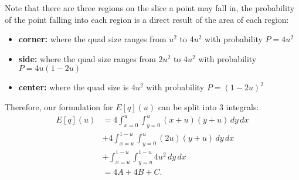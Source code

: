 Note that there are three regions on the slice a point may fall in,
the probability of the point falling into each region is a direct result
of the area of each region:

\begin{itemize}
\item \textbf{corner:} where the quad size ranges from $u^2$ to $4u^2$
                    with probability $P = 4u^2$
\item \textbf{side:}   where the quad size ranges from $2u^2$ to $4u^2$ 
                    with probability $P = 4u(1-2u)$
\item \textbf{center:} where the quad size is $4u^2$
                    with probability $P = (1-2u)^2$
\end{itemize}

Therefore, our formulation for $E[q](u)$ can be split into 3 integrals:
\begin{align*}
  E[q](u) &=   4 \int_{x=0}^u \int_{y=0}^u (x+u)(y+u) \, dy \, dx     \\
           & + 4 \int_{x=u}^{1-u} \int_{y=0}^u (2u)(y+u) \, dy \, dx \\
           & + \int_{x=u}^{1-u} \int_{y=u}^{1-u} 4u^2 \, dy \, dx    \\
          &= 4A + 4B + C
          \text{.}
\end{align*}

